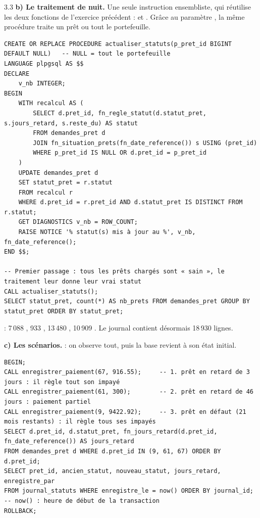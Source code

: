 \begin{correction}{3.3}
\textbf{b) Le traitement de nuit.} Une seule instruction ensembliste, qui réutilise les deux
fonctions de l'exercice précédent :  et . Grâce au
paramètre , la même procédure traite un prêt ou tout le portefeuille.
\begin{lstlisting}[style=long]
CREATE OR REPLACE PROCEDURE actualiser_statuts(p_pret_id BIGINT DEFAULT NULL)   -- NULL = tout le portefeuille
LANGUAGE plpgsql AS $$
DECLARE
    v_nb INTEGER;
BEGIN
    WITH recalcul AS (
        SELECT d.pret_id, fn_regle_statut(d.statut_pret, s.jours_retard, s.reste_du) AS statut
        FROM demandes_pret d
        JOIN fn_situation_prets(fn_date_reference()) s USING (pret_id)
        WHERE p_pret_id IS NULL OR d.pret_id = p_pret_id
    )
    UPDATE demandes_pret d
    SET statut_pret = r.statut
    FROM recalcul r
    WHERE d.pret_id = r.pret_id AND d.statut_pret IS DISTINCT FROM r.statut;
    GET DIAGNOSTICS v_nb = ROW_COUNT;
    RAISE NOTICE '% statut(s) mis à jour au %', v_nb, fn_date_reference();
END $$;

-- Premier passage : tous les prêts chargés sont « sain », le traitement leur donne leur vrai statut
CALL actualiser_statuts();
SELECT statut_pret, count(*) AS nb_prets FROM demandes_pret GROUP BY statut_pret ORDER BY statut_pret;
\end{lstlisting}

\begin{resultat}
 : 7\,088 , 933 ,
13\,480 , 10\,909 . Le journal contient désormais 18\,930 lignes.
\end{resultat}

\textbf{c) Les scénarios.}  : on observe tout, puis la base revient à son état
initial.
\begin{lstlisting}[style=long]
BEGIN;
CALL enregistrer_paiement(67, 916.55);     -- 1. prêt en retard de 3 jours : il règle tout son impayé
CALL enregistrer_paiement(61, 300);        -- 2. prêt en retard de 46 jours : paiement partiel
CALL enregistrer_paiement(9, 9422.92);     -- 3. prêt en défaut (21 mois restants) : il règle tous ses impayés
SELECT d.pret_id, d.statut_pret, fn_jours_retard(d.pret_id, fn_date_reference()) AS jours_retard
FROM demandes_pret d WHERE d.pret_id IN (9, 61, 67) ORDER BY d.pret_id;
SELECT pret_id, ancien_statut, nouveau_statut, jours_retard, enregistre_par
FROM journal_statuts WHERE enregistre_le = now() ORDER BY journal_id;    -- now() : heure de début de la transaction
ROLLBACK;
\end{lstlisting}


\end{correction}
